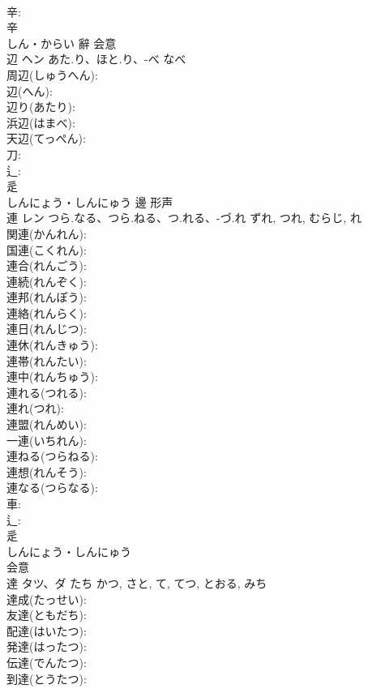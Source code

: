 \documentclass[8pt]{extreport}
\begin{document}
\begin{CJK}{UTF8}{min}
\\	辛: 
\\	辛	
\\	しん・からい	辭	会意 
\\	辺	ヘン	あた.り、ほと.り、-べ	なべ	
\\	周辺(しゅうへん): 
\\	辺(へん): 
\\	辺り(あたり): 
\\	浜辺(はまべ): 
\\	天辺(てっぺん): 
\\	刀: 
\\	辶: 
\\	辵	
\\	しんにょう・しんにゅう	邊	形声 
\\	連	レン	つら.なる、つら.ねる、つ.れる、-づ.れ	ずれ, つれ, むらじ, れ	
\\	関連(かんれん): 
\\	国連(こくれん): 
\\	連合(れんごう): 
\\	連続(れんぞく): 
\\	連邦(れんぽう): 
\\	連絡(れんらく): 
\\	連日(れんじつ): 
\\	連休(れんきゅう): 
\\	連帯(れんたい): 
\\	連中(れんちゅう): 
\\	連れる(つれる): 
\\	連れ(つれ): 
\\	連盟(れんめい): 
\\	一連(いちれん): 
\\	連ねる(つらねる): 
\\	連想(れんそう): 
\\	連なる(つらなる): 
\\	車: 
\\	辶: 
\\	辵	
\\	しんにょう・しんにゅう	
\\	会意 
\\	達	タツ、ダ	たち	かつ, さと, て, てつ, とおる, みち	
\\	達成(たっせい): 
\\	友達(ともだち): 
\\	配達(はいたつ): 
\\	発達(はったつ): 
\\	伝達(でんたつ): 
\\	到達(とうたつ): 

\end{CJK}
\end{document}
